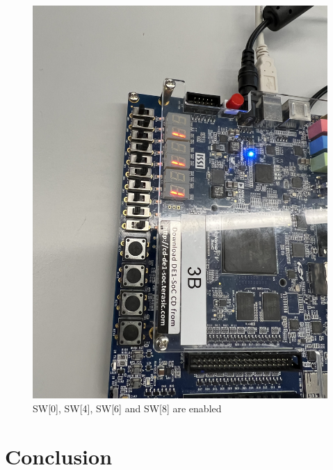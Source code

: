 \documentclass[
	letterpaper, %
	10pt, %
]{CSUniSchoolLabReport}
\begin{document}
\begin{figure}[H]
  \centering
  \includegraphics[width=.9\textwidth]{Figures/Three1.jpg}
  \caption{SW[0], SW[4], SW[6] and SW[8] are enabled}
  \label{fig:19}
\end{figure}

\section{Conclusion}

\hspace{.5 in} 
\end{document}
